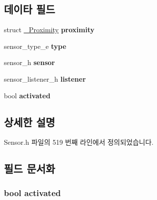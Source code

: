 \subsection*{데이타 필드}
\begin{DoxyCompactItemize}
\item 
\hypertarget{struct__ProximityExtend_a79740711df66cd887ecab71528fc1f70}{struct \hyperlink{struct__Proximity}{\-\_\-\-Proximity} {\bfseries proximity}}\label{struct__ProximityExtend_a79740711df66cd887ecab71528fc1f70}

\item 
\hypertarget{struct__ProximityExtend_abffb09766da2fc510a79bb51f82a36e1}{sensor\-\_\-type\-\_\-e {\bfseries type}}\label{struct__ProximityExtend_abffb09766da2fc510a79bb51f82a36e1}

\item 
\hypertarget{struct__ProximityExtend_a5bae9b7801bc3808411925cde81d3f26}{sensor\-\_\-h {\bfseries sensor}}\label{struct__ProximityExtend_a5bae9b7801bc3808411925cde81d3f26}

\item 
\hypertarget{struct__ProximityExtend_aa977dfb866b24fd7d9a20a9a01b2fd1f}{sensor\-\_\-listener\-\_\-h {\bfseries listener}}\label{struct__ProximityExtend_aa977dfb866b24fd7d9a20a9a01b2fd1f}

\item 
\hypertarget{struct__ProximityExtend_a73e9fa0c3543560192f38a8ab6a78c47}{bool {\bfseries activated}}\label{struct__ProximityExtend_a73e9fa0c3543560192f38a8ab6a78c47}

\end{DoxyCompactItemize}


\subsection{상세한 설명}


Sensor.\-h 파일의 519 번째 라인에서 정의되었습니다.



\subsection{필드 문서화}
\hypertarget{struct__ProximityExtend_a73e9fa0c3543560192f38a8ab6a78c47}{
\subsubsection[{activated}]{\setlength{\rightskip}{0pt plus 5cm}bool activated}}\label{struct__ProximityExtend_a73e9fa0c3543560192f38a8ab6a78c47}


